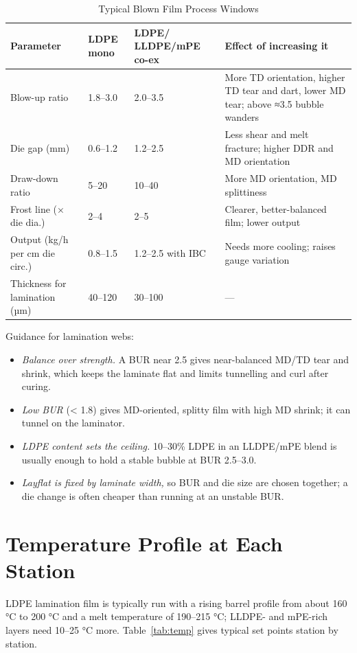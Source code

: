 \documentclass[10pt,twocolumn,a4paper]{article}
\begin{document}
\begin{table}[!t]
\caption{Typical Blown Film Process Windows}
\label{tab:window}
\footnotesize
\begin{tabularx}{\columnwidth}{@{}p{19mm}p{11mm}p{14mm}L@{}}
\toprule
\textbf{Parameter} & \textbf{LDPE mono} & \textbf{LDPE/ LLDPE/mPE co-ex} & \textbf{Effect of increasing it}\\
\midrule
Blow-up ratio & 1.8–3.0 & 2.0–3.5 & More TD orientation, higher TD tear and dart, lower MD tear; above ≈3.5 bubble wanders\\
Die gap (mm) & 0.6–1.2 & 1.2–2.5 & Less shear and melt fracture; higher DDR and MD orientation\\
Draw-down ratio & 5–20 & 10–40 & More MD orientation, MD splittiness\\
Frost line (× die dia.) & 2–4 & 2–5 & Clearer, better-balanced film; lower output\\
Output (kg/h per cm die circ.) & 0.8–1.5 & 1.2–2.5 with IBC & Needs more cooling; raises gauge variation\\
Thickness for lamination (µm) & 40–120 & 30–100 & ---\\
\bottomrule
\end{tabularx}
\end{table}

Guidance for lamination webs:
\begin{itemize}\setlength\itemsep{1pt}
\item \textit{Balance over strength.} A BUR near 2.5 gives near-balanced MD/TD tear and shrink, which keeps the laminate flat and limits tunnelling and curl after curing.
\item \textit{Low BUR} (< 1.8) gives MD-oriented, splitty film with high MD shrink; it can tunnel on the laminator.
\item \textit{LDPE content sets the ceiling.} 10–30\% LDPE in an LLDPE/mPE blend is usually enough to hold a stable bubble at BUR 2.5–3.0.
\item \textit{Layflat is fixed by laminate width,} so BUR and die size are chosen together; a die change is often cheaper than running at an unstable BUR.
\end{itemize}

\section{Temperature Profile at Each Station}

LDPE lamination film is typically run with a rising barrel profile from about 160 °C to 200 °C and a melt temperature of 190–215 °C; LLDPE- and mPE-rich layers need 10–25 °C more. Table~\ref{tab:temp} gives typical set points station by station.
\end{document}
